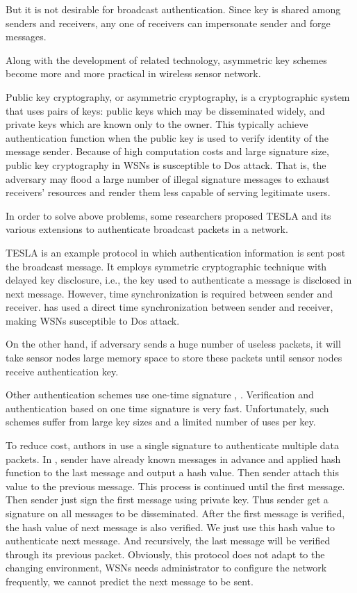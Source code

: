 \documentclass{sig-alternate-05-2015}
\begin{document}
But it is not desirable for broadcast authentication. Since key is shared among senders and receivers, any one of receivers can impersonate sender and forge messages.

Along with the development of related technology, asymmetric key schemes become more and more practical in wireless sensor network. 

Public key cryptography, or asymmetric cryptography, is a cryptographic system that uses pairs of keys: public keys which may be disseminated widely, and private keys which are known only to the owner. This typically achieve authentication function when the public key is used to verify identity of the message sender. Because of high computation costs and large signature size, public key cryptography in WSNs is susceptible to Dos attack. That is, the adversary may flood a large number of illegal signature messages to exhaust receivers' resources and render them less capable of serving legitimate users. 

In order to solve above problems, some researchers proposed TESLA\cite{Tesla} and its various extensions \cite{multi} to authenticate broadcast packets in a network.

TESLA is an example protocol in which authentication information is sent post the broadcast message. It employs symmetric cryptographic technique with delayed key disclosure, i.e., the key used to authenticate a message is disclosed in next message. However, time synchronization is required between sender and receiver. \cite{Tesla} has used a direct time synchronization between sender and receiver, making WSNs susceptible to Dos attack.

On the other hand, if adversary sends a huge number of useless packets, it will take sensor nodes large memory space to store these packets until sensor nodes receive authentication key.

Other authentication schemes use one-time signature \cite{Biba}, \cite{HORSIC}. Verification and authentication based on one time signature is very fast. Unfortunately, such schemes suffer from large key sizes and a limited number of uses per key.

To reduce cost, authors in \cite{aspect} use a single signature to authenticate multiple data packets. In \cite{aspect}, sender have already known messages in advance and applied hash function to the last message and output a hash value. Then sender attach this value to the previous message. This process is continued until the first message. Then sender just sign the first message using private key. Thus sender get a signature on all messages to be disseminated. After the first message is verified, the hash value of next message is also verified. We just use this hash value to authenticate next message. And recursively, the last message will be verified through its previous packet. Obviously, this protocol does not adapt to the changing environment, WSNs needs administrator to configure the network frequently, we cannot predict the next message to be sent. 
\end{document}
